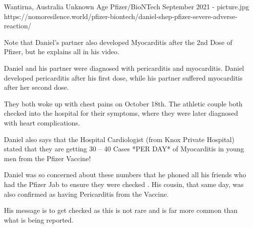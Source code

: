 {Wantirna, Australia}
{Unknown Age}
{Pfizer/BioNTech}
{September 2021}
{-}
{picture.jpg}
{https://nomoresilence.world/pfizer-biontech/daniel-shep-pfizer-severe-adverse-reaction/}
{


Note that Daniel’s partner also developed Myocarditis after the 2nd Dose of Pfizer, but he explains all in his video.

Daniel and his partner were diagnosed with pericarditis and myocarditis. Daniel developed pericarditis after his first dose, while his partner suffered myocarditis after her second dose.

They both woke up with chest pains on October 18th. The athletic couple both checked into the hospital for their symptoms, where they were later diagnosed with heart complications.

Daniel also says that the Hospital Cardiologist (from Knox Private Hospital) stated that they are getting 30 – 40 Cases *PER DAY* of Myocarditis in young men from the Pfizer Vaccine!

Daniel was so concerned about these numbers that he phoned all his friends who had the Pfizer Jab to ensure they were checked . His cousin, that same day, was also confirmed as having Pericarditis from the Vaccine.

His message is to get checked as this is not rare and is far more common than what is being reported.
}
